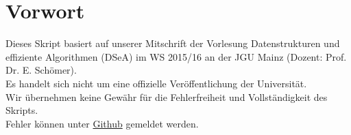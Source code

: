 \chapter{Vorwort}
Dieses Skript basiert auf unserer Mitschrift der Vorlesung Datenstrukturen und effiziente Algorithmen (DSeA) im WS 2015/16 an der JGU Mainz (Dozent: Prof. Dr. E. Schömer).\\ 
Es handelt sich nicht um eine offizielle  Veröffentlichung  der Universität.\\
Wir übernehmen keine Gewähr für die Fehlerfreiheit und Vollständigkeit des Skripts.\\
Fehler können unter \href{https://github.com/Gusser93/DSeA-Vorlesung}{Github} gemeldet werden.